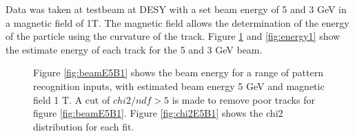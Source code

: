 Data was taken at testbeam at DESY with a set beam energy of 5 and 3 GeV in a magnetic field of 1T. The magnetic field allows the determination of the energy of the particle using the curvature of the track. Figure \ref{fig:energy0} and \ref{fig:energy1} show the estimate energy of each track for the 5 and 3 GeV beam. 
\begin{figure}[H]
\hspace{-2.5cm}
\caption{Figure \ref{fig:beamE5B1} shows the beam energy for a range of pattern recognition inputs, with estimated beam energy 5 GeV and magnetic field 1 T. A cut of  $chi2/ndf > 5$ is made to remove poor tracks for figure \ref{fig:beamE5B1}. Figure \ref{fig:chi2E5B1} shows the chi2 distribution for each fit. }
\label{fig:energy0}
\end{figure}

